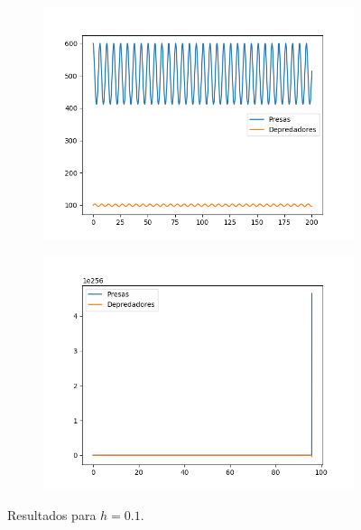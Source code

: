 \documentclass[11pt,a4paper]{article}
\begin{document}
\begin{figure}[H]
\centering
\begin{subfigure}{.5\textwidth}
	\centering
	\includegraphics[scale=0.45]{img/rk-0-1}
\end{subfigure}%
\begin{subfigure}{.5\textwidth}
	\centering
	\includegraphics[scale=0.45]{img/eu-0-1}
\end{subfigure}
\caption{Resultados para $h=0.1$.}
\label{fig:h-0.1}
\end{figure}
\end{document}
